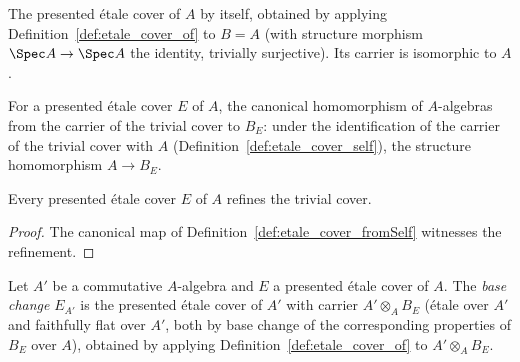 \begin{definition}
  \label{def:etale_cover_self}
  \leanok
  The presented \'etale cover of \(A\) by itself, obtained by applying
  Definition~\ref{def:etale_cover_of} to \(B = A\) (with structure morphism \(\Spec A \to
  \Spec A\) the identity, trivially surjective). Its carrier is isomorphic to \(A\).
\end{definition}

\begin{definition}
  \label{def:etale_cover_fromSelf}
  \leanok
  For a presented \'etale cover \(E\) of \(A\), the canonical homomorphism of \(A\)-algebras
  from the carrier of the trivial cover to \(B_E\): under the identification of the carrier of
  the trivial cover with \(A\) (Definition~\ref{def:etale_cover_self}), the structure
  homomorphism \(A \to B_E\).
\end{definition}

\begin{lemma}
  \label{lem:etale_cover_refines_self}
  \leanok
  Every presented \'etale cover \(E\) of \(A\) refines the trivial cover.
\end{lemma}
\begin{proof}
  \leanok
  The canonical map of Definition~\ref{def:etale_cover_fromSelf} witnesses the refinement.
\end{proof}

\begin{definition}
  \label{def:etale_cover_baseChange}
  \leanok
  Let \(A'\) be a commutative \(A\)-algebra and \(E\) a presented \'etale cover of \(A\). The
  \emph{base change} \(E_{A'}\) is the presented \'etale cover of \(A'\) with carrier
  \(A' \otimes_A B_E\) (\'etale over \(A'\) and faithfully flat over \(A'\), both by base
  change of the corresponding properties of \(B_E\) over \(A\)), obtained by applying
  Definition~\ref{def:etale_cover_of} to \(A' \otimes_A B_E\).
\end{definition}

